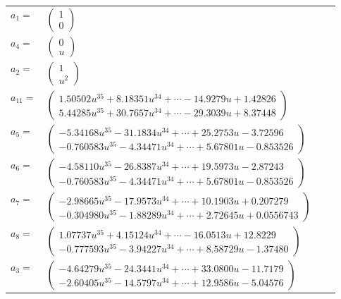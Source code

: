 \documentclass[1p]{elsarticle_modified}
\theoremstyle{definition}
\begin{document}
\begin{tabular}{m{7pt} m{180pt} m{7pt} m{180pt} }
\flushright $a_{1}=$&$\begin{pmatrix}1\\0\end{pmatrix}$ \\
\flushright $a_{4}=$&$\begin{pmatrix}0\\u\end{pmatrix}$ \\
\flushright $a_{2}=$&$\begin{pmatrix}1\\u^2\end{pmatrix}$ \\
\flushright $a_{11}=$&$\begin{pmatrix}1.50502 u^{35}+8.18351 u^{34}+\cdots-14.9279 u+1.42826\\5.44285 u^{35}+30.7657 u^{34}+\cdots-29.3039 u+8.37448\end{pmatrix}$ \\
\flushright $a_{5}=$&$\begin{pmatrix}-5.34168 u^{35}-31.1834 u^{34}+\cdots+25.2753 u-3.72596\\-0.760583 u^{35}-4.34471 u^{34}+\cdots+5.67801 u-0.853526\end{pmatrix}$ \\
\flushright $a_{6}=$&$\begin{pmatrix}-4.58110 u^{35}-26.8387 u^{34}+\cdots+19.5973 u-2.87243\\-0.760583 u^{35}-4.34471 u^{34}+\cdots+5.67801 u-0.853526\end{pmatrix}$ \\
\flushright $a_{7}=$&$\begin{pmatrix}-2.98665 u^{35}-17.9573 u^{34}+\cdots+10.1903 u+0.207279\\-0.304980 u^{35}-1.88289 u^{34}+\cdots+2.72645 u+0.0556743\end{pmatrix}$ \\
\flushright $a_{8}=$&$\begin{pmatrix}1.07737 u^{35}+4.15124 u^{34}+\cdots-16.0513 u+12.8229\\-0.777593 u^{35}-3.94227 u^{34}+\cdots+8.58729 u-1.37480\end{pmatrix}$ \\
\flushright $a_{3}=$&$\begin{pmatrix}-4.64279 u^{35}-24.3441 u^{34}+\cdots+33.0800 u-11.7179\\-2.60405 u^{35}-14.5797 u^{34}+\cdots+12.9586 u-5.04576\end{pmatrix}$ \\

\end{tabular}
\end{document}

